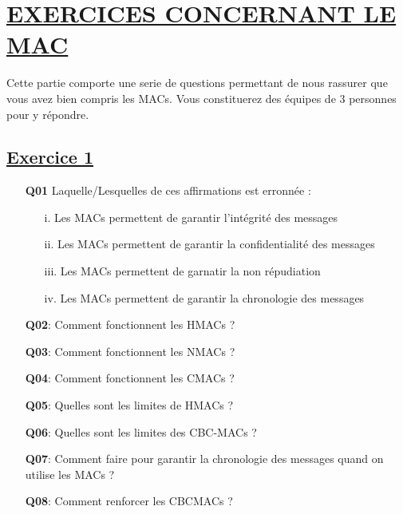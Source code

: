\section{\textbf{\underline{EXERCICES CONCERNANT LE MAC}}}

Cette partie comporte une serie de questions permettant de nous rassurer que vous avez bien compris les MACs. Vous constituerez des équipes de 3 personnes pour y répondre. 

\subsection{\textbf{\underline{Exercice 1}}} 
\label{Exo 1}

\begin{enumerate}
    \item [\textbf{Q01}] Laquelle/Lesquelles de ces affirmations est erronnée :
    \begin{itemize}
        \item [i.] Les MACs permettent de garantir l'intégrité des messages
        \item [ii.] Les MACs permettent de garantir la confidentialité des messages
        \item [iii.] Les MACs permettent de garnatir la non répudiation
        \item [iv.] Les MACs permettent de garantir la chronologie des messages
    \end{itemize}
    
    \item [\textbf{Q02}:] Comment fonctionnent les HMACs ?
    
    \item [\textbf{Q03}:] Comment fonctionnent les NMACs ?

    \item [\textbf{Q04}:] Comment fonctionnent les CMACs ?
    
    \item [\textbf{Q05}:] Quelles sont les limites de HMACs ?
    
    \item [\textbf{Q06}:] Quelles sont les limites des CBC-MACs ?
    
    \item [\textbf{Q07}:] Comment faire pour garantir la chronologie des messages quand on utilise les MACs ?
    
    \item [\textbf{Q08}:] Comment renforcer les CBCMACs ?
    

\end{enumerate}
